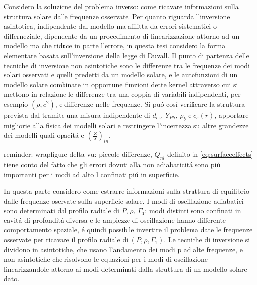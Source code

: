 \documentclass[../main.tex]{subfiles}
\begin{document}
\begin{errata}
Considero la soluzione del problema inverso: come ricavare informazioni sulla struttura solare dalle frequenze osservate. Per quanto riguarda l'inversione asintotica, indipendente dal modello ma afflitta da errori sistematici o differneziale, dipendente da un procedimento di linearizzazione attorno ad un modello ma che riduce in parte l'errore, in questa tesi considero la forma elementare basata sull'inversione della legge di Duvall.
Il punto di partenza delle tecniche di inversione non asintotiche sono le  differenze tra le frequenze dei modi solari osservati e quelli predetti da un modello solare, e le autofunzioni di un modello solare combinate in opportune funzioni dette kernel attraverso cui si mettono in relazione le differenze tra una coppia di variabili indipendenti, per esempio $(\rho,c^2)$, e differenze nelle frequenze.
Si pu\'o cos\'i verificare la struttura prevista dal \mss{} tramite una misura indipendente di $d_{cz}$, $Y_{Ph}$, $\rho_b$ e $c_s(r)$, apportare migliorie alla fisica dei modelli solari e restringere l'incertezza su altre grandezze dei modelli quali opacit\'a e $(\frac{Z}{X})_{in}$.
\end{errata}

\begin{workout}
reminder: wrapfigure delta vu: piccole differenze, $Q_{nl}$ definito in \eqref{eq:surfaceeffects} tiene conto del fatto che gli errori dovuti alla non adiabaticit\'a sono pi\'u importanti per i modi ad alto l confinati pi\'u in superficie.
\end{workout}

\begin{workout}
In questa parte considero come estrarre informazioni sulla struttura di equilibrio dalle frequenze oservate sulla superficie solare. I modi di oscillazione adiabatici sono determinati dal profilo radiale di $P$, $\rho$, $\Gamma_1$; modi distinti sono confinati in cavit\'a di profondit\'a diversa e le ampiezze di oscillazione hanno differente comportamento spaziale, \'e quindi possibile invertire il problema date le frequenze osservate per ricavare il profilo radiale di $(P,\rho,\Gamma_1)$. Le tecniche di inversione si dividono in asintotiche, che usano l'andamento dei modi p ad alte frequenze, e non asintotiche che risolvono le equazioni per i modi di oscillazione linearizzandole attorno ai modi determinati dalla struttura di un modello solare dato.
 
\end{workout}
\end{document}
